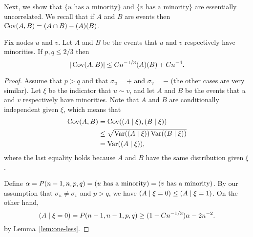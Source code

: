 \documentclass[EJP,final]{ejpecp}
\newcommand{\1}[1]{\mathbbm{1}_{\{#1\}}}
\let\Pr\relax
\DeclareMathOperator{\Pr}{Pr}
\DeclareMathOperator{\Var}{Var}
\DeclareMathOperator{\Cov}{Cov}
\begin{document}
Next, we show that $\{u \text{ has a minority}\}$ and
$\{v \text{ has a minority}\}$ are essentially uncorrelated.
We recall that if $A$ and $B$ are events then
$\Cov(A, B) = \Pr(A \cap B) - \Pr(A) \Pr(B)$.

\begin{lemma}\label{lem:minority-covariance}
Fix nodes $u$ and $v$. Let $A$ and $B$
be the events that $u$ and $v$ respectively have minorities.
If $p, q \le 2/3$ then
\[
  |\Cov(A, B)| \le C n^{-1/3} \Pr(A) \Pr(B) + C n^{-4}.
\]
\end{lemma}

\begin{proof}
 Assume that $p > q$ and that $\sigma_u = +$ and $\sigma_v = -$
 (the other cases are very similar).
 Let $\xi$ be the indicator that $u \sim v$, and let $A$ and $B$
 be the events that $u$ and $v$ respectively have minorities.
 Note that $A$ and $B$ are conditionally independent given $\xi$,
 which means that
 \begin{align*}
  \Cov(A, B)
  &= \Cov(\Pr(A \mid \xi), \Pr(B \mid \xi)) \\
  &\le \sqrt{\Var(\Pr(A \mid \xi)) \Var(\Pr(B \mid \xi))} \\
  &= \Var(\Pr(A \mid \xi)),
 \end{align*}
 where the last equality holds because $A$ and $B$ have the same
 distribution given $\xi$.

 Define
 $\alpha = P(n-1, n, p, q) = \Pr(\text{$u$ has a minority}) =
 \Pr(\text{$v$ has a minority})$. By our assumption that
 $\sigma_u \ne \sigma_v$ and $p > q$, we have
 $\Pr(A \mid \xi = 0) \le \Pr(A \mid \xi = 1)$.
 On the other hand,
 \[
   \Pr(A \mid \xi = 0) = P(n-1, n-1, p, q) \ge (1 - C n^{-1/3}) \alpha - 2n^{-2}.
 \]
 by Lemma~\ref{lem:one-less}.


\end{proof}
\end{document}
